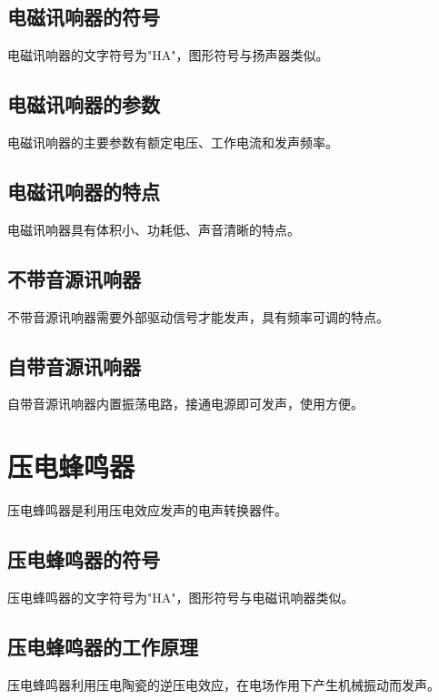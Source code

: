 \documentclass[12pt,UTF8]{ctexbook}
\begin{document}
\subsection{电磁讯响器的符号}

电磁讯响器的文字符号为"HA"，图形符号与扬声器类似。

\subsection{电磁讯响器的参数}

电磁讯响器的主要参数有额定电压、工作电流和发声频率。

\subsection{电磁讯响器的特点}

电磁讯响器具有体积小、功耗低、声音清晰的特点。

\subsection{不带音源讯响器}

不带音源讯响器需要外部驱动信号才能发声，具有频率可调的特点。

\subsection{自带音源讯响器}

自带音源讯响器内置振荡电路，接通电源即可发声，使用方便。

\section{压电蜂鸣器}

压电蜂鸣器是利用压电效应发声的电声转换器件。

\subsection{压电蜂鸣器的符号}

压电蜂鸣器的文字符号为"HA"，图形符号与电磁讯响器类似。

\subsection{压电蜂鸣器的工作原理}

压电蜂鸣器利用压电陶瓷的逆压电效应，在电场作用下产生机械振动而发声。
\end{document}
